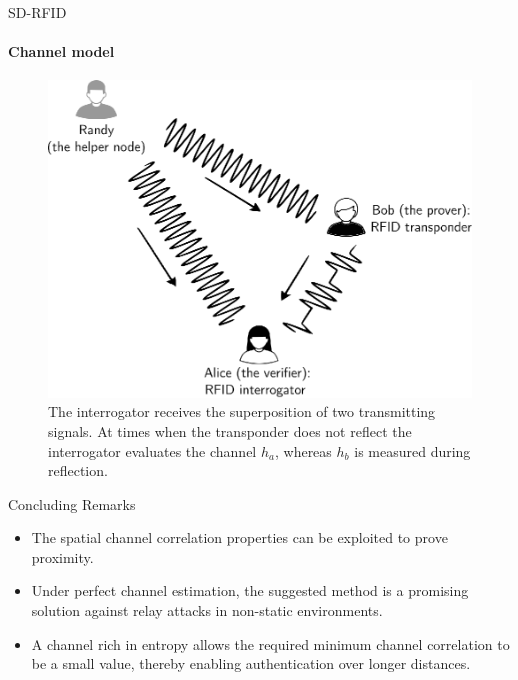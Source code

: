 
\begin{frame}{SD-RFID}
\framesubtitle{Channel model}
\begin{figure}
    \vspace{-1cm}    
    \includegraphics[scale = 0.6]{figures/against_distance_fraud/superposition.eps}
    \caption{The interrogator receives the superposition of two transmitting signals. At times when the transponder does not reflect the interrogator evaluates the channel $h_a$, whereas $h_b$ is measured during reflection.}
    \label{fig:enter-label}
\end{figure}
    
\end{frame}

\begin{frame}{Concluding Remarks}
\begin{itemize}
    \item The spatial channel correlation properties can be exploited to prove proximity.

    \item Under perfect channel estimation, the suggested method is a promising solution against relay attacks in non-static environments.

    \item A channel rich in entropy allows the required minimum channel correlation to be a small value, thereby enabling authentication over longer distances.

\end{itemize}
\end{frame}

